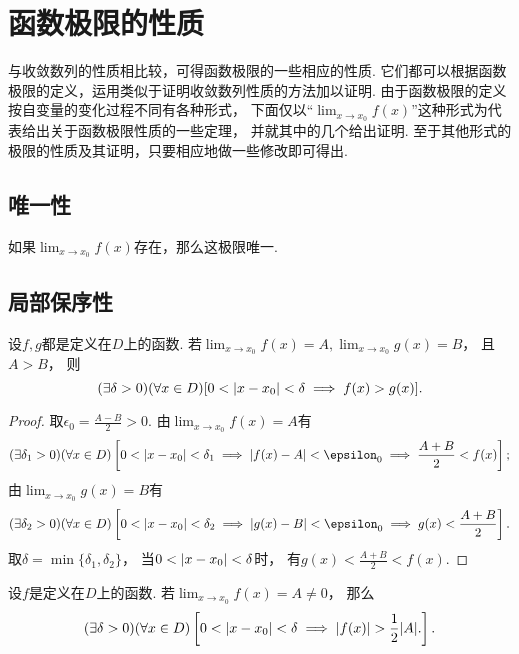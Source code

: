 \section{函数极限的性质}
与收敛数列的性质相比较，可得函数极限的一些相应的性质.
它们都可以根据函数极限的定义，运用类似于证明收敛数列性质的方法加以证明.
由于函数极限的定义按自变量的变化过程不同有各种形式，
下面仅以“\(\lim_{x \to x_0}f(x)\)”这种形式为代表给出关于函数极限性质的一些定理，
并就其中的几个给出证明.
至于其他形式的极限的性质及其证明，只要相应地做一些修改即可得出.

\subsection{唯一性}
\begin{theorem}[唯一性]\label{theorem:极限.函数极限的唯一性}
如果\(\lim_{x \to x_0} f(x)\)存在，那么这极限唯一.
\end{theorem}

\subsection{局部保序性}
\begin{theorem}[局部保序性]\label{theorem:极限.函数极限的局部保序性1}
设\(f,g\)都是定义在\(D\)上的函数.
若\(\lim_{x\to x_0} f(x) = A,
\lim_{x\to x_0} g(x) = B\)，
且\(A>B\)，
则\[
	(\exists\delta>0)
	(\forall x\in D)
	[0<\abs{x-x_0}<\delta \implies f(x)>g(x)].
\]
\begin{proof}
取\(\epsilon_0=\frac{A-B}2>0\).
由\(\lim_{x\to x_0} f(x) = A\)有\[
	(\exists\delta_1>0)
	(\forall x\in D)
	\left[
		0<\abs{x - x_0}<\delta_1
		\implies
		\abs{f(x) - A}<\epsilon_0
		\implies
		\frac{A+B}2 < f(x)
	\right];
\]
由\(\lim_{x\to x_0} g(x) = B\)有\[
	(\exists\delta_2>0)
	(\forall x\in D)
	\left[
		0<\abs{x - x_0}<\delta_2
		\implies
		\abs{g(x) - B}<\epsilon_0
		\implies
		g(x) < \frac{A+B}2
	\right].
\]
取\(\delta=\min\{\delta_1,\delta_2\}\)，
当\(0<\abs{x-x_0}<\delta\)时，
有\(g(x) < \frac{A+B}2 < f(x)\).
\end{proof}
\end{theorem}

\begin{corollary}\label{theorem:极限.函数极限的局部保序性1.推论1}
设\(f\)是定义在\(D\)上的函数.
若\(\lim_{x\to x_0} f(x) = A \neq 0\)，
那么\[
	(\exists \delta>0)
	(\forall x\in D)
	\left[
		0<\abs{x-x_0}<\delta
		\implies
		\abs{f(x)}>\frac12\abs{A}.
	\right].
\]
\end{corollary}

